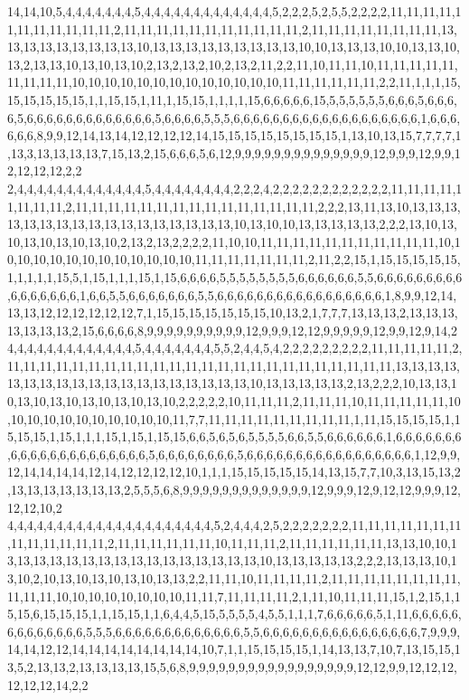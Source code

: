 14,14,10,5,4,4,4,4,4,4,4,5,4,4,4,4,4,4,4,4,4,4,4,4,4,5,2,2,2,5,2,5,5,2,2,2,2,11,11,11,11,11,11,11,11,11,11,11,2,11,11,11,11,11,11,11,11,11,11,11,2,11,11,11,11,11,11,11,11,13,13,13,13,13,13,13,13,13,10,13,13,13,13,13,13,13,13,13,10,10,13,13,13,10,10,13,13,10,13,2,13,13,10,13,10,13,10,2,13,2,13,2,10,2,13,2,11,2,2,11,10,11,11,10,11,11,11,11,11,11,11,11,11,10,10,10,10,10,10,10,10,10,10,10,10,10,11,11,11,11,11,11,2,2,11,1,1,1,15,15,15,15,15,15,1,1,15,15,1,11,1,15,15,1,1,1,1,15,6,6,6,6,6,15,5,5,5,5,5,5,6,6,6,5,6,6,6,6,5,6,6,6,6,6,6,6,6,6,6,6,6,6,5,6,6,6,6,5,5,5,6,6,6,6,6,6,6,6,6,6,6,6,6,6,6,6,6,6,6,1,6,6,6,6,6,6,8,9,9,12,14,13,14,12,12,12,12,14,15,15,15,15,15,15,15,15,1,13,10,13,15,7,7,7,7,1,13,3,13,13,13,13,7,15,13,2,15,6,6,6,5,6,12,9,9,9,9,9,9,9,9,9,9,9,9,9,9,12,9,9,9,12,9,9,12,12,12,12,2,2
2,4,4,4,4,4,4,4,4,4,4,4,4,4,5,4,4,4,4,4,4,4,4,2,2,2,4,2,2,2,2,2,2,2,2,2,2,2,2,11,11,11,11,11,11,11,11,2,11,11,11,11,11,11,11,11,11,11,11,11,11,11,11,2,2,2,13,11,13,10,13,13,13,13,13,13,13,13,13,13,13,13,13,13,13,13,13,10,13,10,10,13,13,13,13,13,2,2,2,13,10,13,10,13,10,13,10,13,10,2,13,2,13,2,2,2,2,11,10,10,11,11,11,11,11,11,11,11,11,11,11,10,10,10,10,10,10,10,10,10,10,10,10,10,11,11,11,11,11,11,11,2,11,2,2,15,1,15,15,15,15,15,1,1,1,1,1,15,5,1,15,1,1,1,15,1,15,6,6,6,6,5,5,5,5,5,5,5,5,6,6,6,6,6,6,5,5,6,6,6,6,6,6,6,6,6,6,6,6,6,6,6,6,1,6,6,5,5,6,6,6,6,6,6,6,5,5,6,6,6,6,6,6,6,6,6,6,6,6,6,6,6,6,6,1,8,9,9,12,14,13,13,12,12,12,12,12,12,7,1,15,15,15,15,15,15,15,10,13,2,1,7,7,7,13,13,13,2,13,13,13,13,13,13,13,2,15,6,6,6,6,8,9,9,9,9,9,9,9,9,9,9,12,9,9,9,12,12,9,9,9,9,9,12,9,9,12,9,14,2
4,4,4,4,4,4,4,4,4,4,4,4,4,5,4,4,4,4,4,4,4,5,5,2,4,4,5,4,2,2,2,2,2,2,2,2,2,11,11,11,11,11,2,11,11,11,11,11,11,11,11,11,11,11,11,11,11,11,11,11,11,11,11,11,11,11,11,13,13,13,13,13,13,13,13,13,13,13,13,13,13,13,13,13,13,13,10,13,13,13,13,13,2,13,2,2,2,10,13,13,10,13,10,13,10,13,10,13,10,13,10,2,2,2,2,2,10,11,11,11,2,11,11,11,10,11,11,11,11,11,10,10,10,10,10,10,10,10,10,10,10,11,7,7,11,11,11,11,11,11,11,11,11,1,11,15,15,15,15,1,15,15,15,1,15,1,1,1,15,1,15,1,15,15,6,6,5,6,5,6,5,5,5,5,6,6,5,5,6,6,6,6,6,6,1,6,6,6,6,6,6,6,6,6,6,6,6,6,6,6,6,6,6,6,6,6,5,6,6,6,6,6,6,6,6,5,6,6,6,6,6,6,6,6,6,6,6,6,6,6,6,6,6,1,12,9,9,12,14,14,14,14,12,14,12,12,12,12,10,1,1,1,15,15,15,15,15,14,13,15,7,7,10,3,13,15,13,2,13,13,13,13,13,13,13,2,5,5,5,6,8,9,9,9,9,9,9,9,9,9,9,9,9,9,12,9,9,9,12,9,12,12,9,9,9,12,12,12,10,2
4,4,4,4,4,4,4,4,4,4,4,4,4,4,4,4,4,4,4,4,4,5,2,4,4,4,2,5,2,2,2,2,2,2,2,11,11,11,11,11,11,11,11,11,11,11,11,11,2,11,11,11,11,11,11,10,11,11,11,2,11,11,11,11,11,11,13,13,10,10,13,13,13,13,13,13,13,13,13,13,13,13,13,13,13,13,10,13,13,13,13,13,2,2,2,13,13,13,10,13,10,2,10,13,10,13,10,13,10,13,13,2,2,11,11,10,11,11,11,11,2,11,11,11,11,11,11,11,11,11,11,11,10,10,10,10,10,10,10,10,11,11,7,11,11,11,11,2,1,11,10,11,11,11,15,1,2,15,1,15,15,6,15,15,15,1,1,15,15,1,1,6,4,4,5,15,5,5,5,5,4,5,5,1,1,1,7,6,6,6,6,6,5,1,11,6,6,6,6,6,6,6,6,6,6,6,6,6,5,5,5,6,6,6,6,6,6,6,6,6,6,6,6,6,5,5,6,6,6,6,6,6,6,6,6,6,6,6,6,6,6,6,7,9,9,9,14,14,12,12,14,14,14,14,14,14,14,14,10,7,1,1,15,15,15,15,1,14,13,13,7,10,7,13,15,15,13,5,2,13,13,2,13,13,13,13,15,5,6,8,9,9,9,9,9,9,9,9,9,9,9,9,9,9,9,9,9,12,12,9,9,12,12,12,12,12,12,14,2,2
